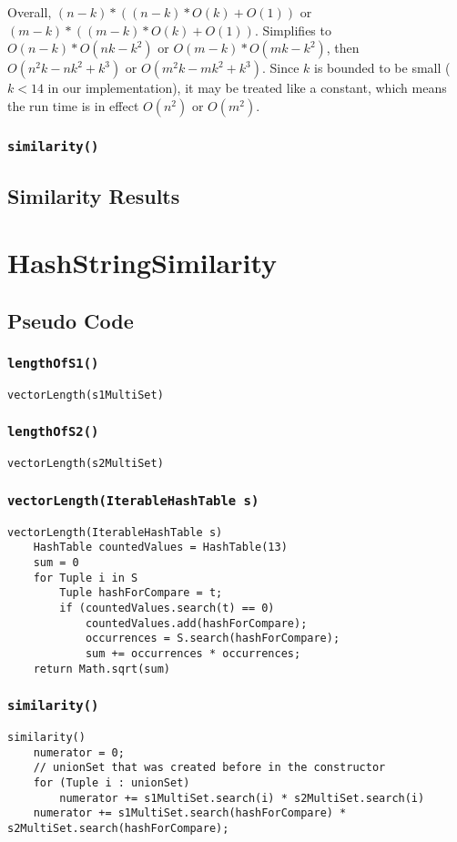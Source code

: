\documentclass[10pt,letterpaper]{article}
\begin{document}
Overall, $(n-k)*((n-k)*O(k)+O(1))$ or $(m-k)*((m-k)*O(k)+O(1))$. Simplifies to
$O(n-k)*O(nk-k^2)$ or $O(m-k)*O(mk-k^2)$, then $O(n^2k-nk^2+k^3)$ or
$O(m^2k-mk^2+k^3)$.  Since $k$ is bounded to be small ($k<14$ in our
implementation), it may be treated like a constant, which means the run time is
in effect $O(n^2)$ or $O(m^2)$.
\subsubsection{\texttt{similarity()}}
\subsection{Similarity Results}
\section{HashStringSimilarity}
\subsection{Pseudo Code}
\subsubsection{\texttt{lengthOfS1()}} 
\begin{verbatim}
vectorLength(s1MultiSet)
\end{verbatim}
\subsubsection{\texttt{lengthOfS2()}}
\begin{verbatim}
vectorLength(s2MultiSet)
\end{verbatim}
\subsubsection{\texttt{vectorLength(IterableHashTable s)}}
\begin{verbatim}
vectorLength(IterableHashTable s)
    HashTable countedValues = HashTable(13)
    sum = 0
    for Tuple i in S
        Tuple hashForCompare = t;
        if (countedValues.search(t) == 0)
            countedValues.add(hashForCompare);
            occurrences = S.search(hashForCompare);
            sum += occurrences * occurrences;
    return Math.sqrt(sum)
\end{verbatim}
\subsubsection{\texttt{similarity()}}
\begin{verbatim}
similarity()
    numerator = 0;
    // unionSet that was created before in the constructor
    for (Tuple i : unionSet)
        numerator += s1MultiSet.search(i) * s2MultiSet.search(i)
    numerator += s1MultiSet.search(hashForCompare) * s2MultiSet.search(hashForCompare);
\end{verbatim}
\end{document}

